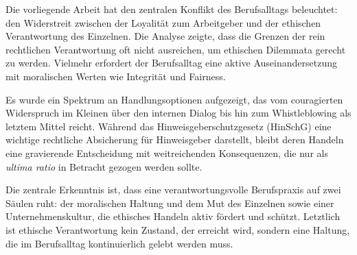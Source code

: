 \documentclass[
    12pt,               %
    a4paper,            %
    ngerman             %
]{scrartcl}
\begin{document}
Die vorliegende Arbeit hat den zentralen Konflikt des Berufsalltags beleuchtet: den Widerstreit zwischen der Loyalität zum Arbeitgeber und der ethischen Verantwortung des Einzelnen. Die Analyse zeigte, dass die Grenzen der rein rechtlichen Verantwortung oft nicht ausreichen, um ethischen Dilemmata gerecht zu werden. Vielmehr erfordert der Berufsalltag eine aktive Auseinandersetzung mit moralischen Werten wie Integrität und Fairness.

Es wurde ein Spektrum an Handlungsoptionen aufgezeigt, das vom couragierten Widerspruch im Kleinen über den internen Dialog bis hin zum Whistleblowing als letztem Mittel reicht. Während das Hinweisgeberschutzgesetz (HinSchG) eine wichtige rechtliche Absicherung für Hinweisgeber darstellt, bleibt deren Handeln eine gravierende Entscheidung mit weitreichenden Konsequenzen, die nur als \textit{ultima ratio} in Betracht gezogen werden sollte.

Die zentrale Erkenntnis ist, dass eine verantwortungsvolle Berufspraxis auf zwei Säulen ruht: der moralischen Haltung und dem Mut des Einzelnen sowie einer Unternehmenskultur, die ethisches Handeln aktiv fördert und schützt. Letztlich ist ethische Verantwortung kein Zustand, der erreicht wird, sondern eine Haltung, die im Berufsalltag kontinuierlich gelebt werden muss.


\newpage %
\nocite{*}
\printbibliography[title={Literaturverzeichnis}]
\end{document}
